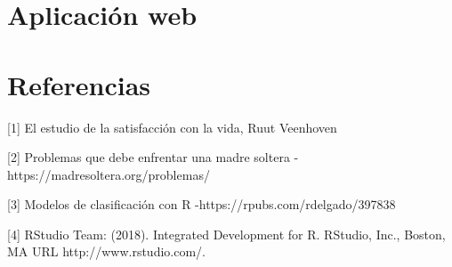 \documentclass[11pt,twoside]{article}
\begin{document}
\section{Aplicación web}






\section{Referencias}
[1] El estudio de la satisfacción con la vida, Ruut Veenhoven 

[2] Problemas que debe enfrentar una madre soltera - https://madresoltera.org/problemas/

[3] Modelos de clasificación con R -https://rpubs.com/rdelgado/397838

[4] RStudio Team: (2018). Integrated Development for R. RStudio, Inc., Boston, MA URL
http://www.rstudio.com/.
\end{document}
